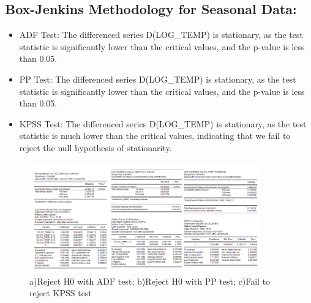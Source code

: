 \documentclass{article} %
\begin{document}
\subsection{Box-Jenkins Methodology for Seasonal Data:}
\begin{itemize}
    \item ADF Test: The differenced series D(LOG\_TEMP) is stationary, as the test statistic is significantly lower than the critical values, and the p-value is less than 0.05.
    \item PP Test: The differenced series D(LOG\_TEMP) is stationary, as the test statistic is significantly lower than the critical values, and the p-value is less than 0.05.
    \item KPSS Test: The differenced series D(LOG\_TEMP) is stationary, as the test statistic is much lower than the critical values, indicating that we fail to reject the null hypothesis of stationarity.
    
\end{itemize}

\begin{figure}[H]
    \centering
    \includegraphics[width=10cm]{images/Capture.PNG}
    \caption*{a)Reject H0 with ADF test; b)Reject H0 with PP test; c)Fail to reject KPSS test}
\end{figure}
\end{document}

